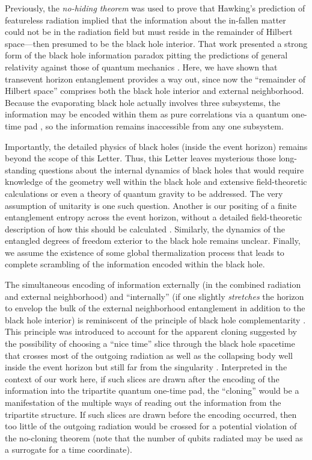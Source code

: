 \documentclass[aps,showpacs,prl,12pt]{revtex4}
\begin{document}
Previously, the {\it no-hiding theorem} \cite{me,Kretschmann} was used to
prove that Hawking's prediction of featureless radiation implied that the
information about the in-fallen matter could not be in the radiation
field but must reside in the remainder of Hilbert space---then
presumed to be the black hole interior. That work presented a strong
form of the black hole information paradox pitting the predictions of
general relativity against those of quantum mechanics \cite{me}. Here,
we have shown that transevent horizon entanglement provides a way out,
since now the ``remainder of Hilbert space'' comprises both the black
hole interior and external neighborhood. Because the evaporating
black hole actually involves three subsystems, the information may be
encoded within them as pure correlations via a quantum one-time
pad \cite{me}, so the information remains inaccessible from any
one subsystem.

Importantly, the detailed physics of black holes (inside the event
horizon) remains beyond the scope of this Letter. Thus, this Letter
leaves mysterious those long-standing questions about the internal
dynamics of black holes that would require knowledge of the geometry
well within the black hole and extensive field-theoretic calculations
or even a theory of quantum gravity to be addressed. The very assumption
of unitarity is one such question. Another is our positing of a finite
entanglement entropy across the event horizon, without a detailed
field-theoretic description of how this should be
calculated \cite{tHooft85,Hawking01,Brustein06,Emparan06,Pad10}.
Similarly, the dynamics of the entangled degrees of
freedom exterior to the black hole remains unclear.
Finally, we assume the existence of some global thermalization process 
that leads to complete scrambling of the information encoded within the 
black hole.

The simultaneous encoding of information externally (in the combined
radiation and external neighborhood) and ``internally'' (if one slightly
{\it stretches\/} the horizon to envelop the bulk of the external
neighborhood entanglement in addition to the black hole interior)
is reminiscent of the principle of black hole complementarity
\cite{Susskind93}. This principle was introduced to account for the
apparent cloning suggested by the possibility of choosing a ``nice time''
slice through the black hole spacetime that crosses most of the
outgoing radiation as well as the collapsing body well inside the
event horizon but still far from the singularity \cite{Lowe95}.
Interpreted in the context of our work here, if such slices are drawn
after the encoding of the information into the tripartite quantum
one-time pad, the ``cloning'' would be a manifestation of the multiple
ways of reading out the information from the tripartite structure.
If such slices are drawn before the encoding occurred, then too
little of the outgoing radiation would be crossed for a potential
violation of the no-cloning theorem (note that the number of qubits
radiated may be used as a surrogate for a time coordinate).
\end{document}
